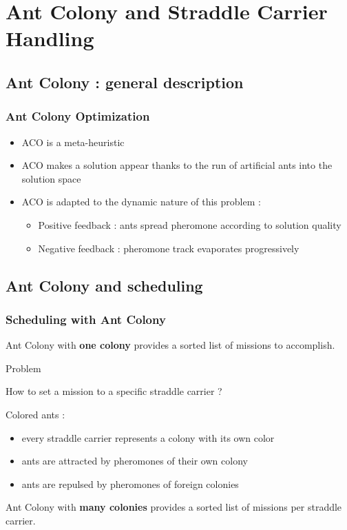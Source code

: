 \documentclass{beamer}
\begin{document}
\section{Ant Colony and Straddle Carrier Handling}
\subsection*{Ant Colony : general description}
\begin{frame}
\frametitle{Ant Colony Optimization\cite{Dorigo91}}
	\begin{itemize}
 		\item ACO is a meta-heuristic
		\item ACO makes a solution appear thanks to the run of artificial ants into the solution space
		\item ACO is adapted to the dynamic nature of this problem :
		\begin{itemize}
		     \item Positive feedback : ants spread pheromone according to solution quality
		     \item Negative feedback : pheromone track evaporates progressively
		\end{itemize}

	\end{itemize}
	
\end{frame}
\subsection*{Ant Colony and scheduling}
\begin{frame}
\frametitle{Scheduling with Ant Colony}
 	
	Ant Colony with \textbf{one colony} provides a sorted list of missions to accomplish.
	\pause
	\begin{block}{Problem}
		\begin{center}
			How to set a mission to a specific straddle carrier ?
		\end{center}
	\end{block}

	
	\pause
	\begin{block}{Colored ants\cite{Bertelle02} : }
	\begin{itemize}
 		\item every straddle carrier represents a colony with its own color
		\item ants are attracted by pheromones of their own colony
		\item ants are repulsed by pheromones of foreign colonies
	\end{itemize}
	\end{block}
	\pause
	Ant Colony with \textbf{many colonies} provides a sorted list of missions per straddle carrier.
	
\end{frame}
\end{document}
